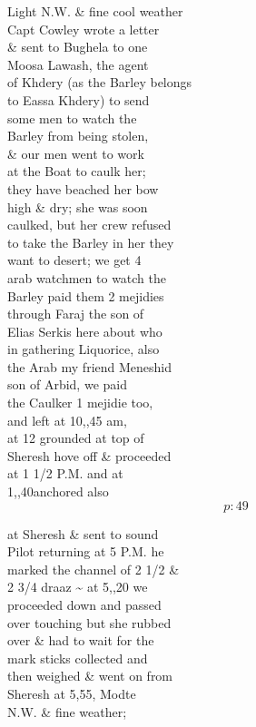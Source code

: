 \documentclass{report}
\begin{document}
	\par{
 	Light N.W. \& fine cool weather\ \\Capt Cowley wrote a letter\ \\\& sent to Bughela to one\ \\Moosa Lawash, the agent\ \\of Khdery (as the Barley belongs\ \\to Eassa Khdery) to send\ \\some men to watch the\ \\Barley from being stolen,\ \\\& our men went to work\ \\at the Boat to caulk her;\ \\they have beached her bow\ \\high \& dry; she was soon\ \\caulked, but her crew refused\ \\to take the Barley in her they\ \\want to desert; we get 4\ \\arab watchmen to watch the\ \\Barley paid them 2 mejidies\ \\through Faraj the son of\ \\Elias Serkis here about who\ \\in gathering Liquorice, also\ \\the Arab my friend Meneshid\ \\son of Arbid, we paid\ \\the Caulker 1 mejidie too,\ \\and left at 10,,45 am,\ \\at 12 grounded at top of\ \\Sheresh hove off \& proceeded\ \\at 1 1/2 P.M. and at\ \\1,,40anchored also\ \\
  \[p: 49 \]

	}






	\par{
 	at Sheresh \& sent to sound\ \\Pilot returning at 5 P.M. he\ \\marked the channel of 2 1/2 \&\ \\2 3/4 draaz \~{} at 5,,20 we\ \\proceeded down and passed\ \\over touching but she rubbed\ \\over \& had to wait for the\ \\mark sticks collected and\ \\then weighed \& went on from\ \\Sheresh at 5,55, Modte\ \\N.W. \& fine weather;\ \\
	}
\end{document}
